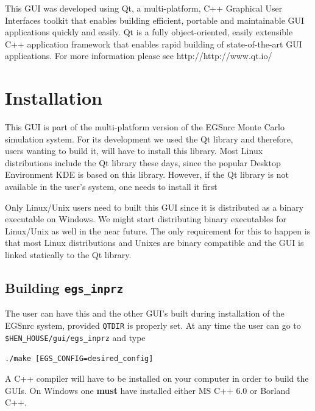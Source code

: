 \documentclass[12pt,twoside]{article}   %
\begin{document}
 This GUI was developed using Qt, a multi-platform, C++ Graphical User Interfaces toolkit
 that enables building efficient, portable and maintainable GUI applications
 quickly and easily. Qt is a fully object-oriented, easily extensible C++ application
 framework that enables rapid building of state-of-the-art GUI applications. For more
 information please see 
{http://http://www.qt.io/}


\newpage
\section{Installation}
\label{installation}


This GUI is part of the multi-platform version\cite{Ka03}
of the EGSnrc Monte Carlo simulation system\cite{Ka09a}.
For its development we used the Qt library and therefore,
users wanting to build it, will have to install this library. Most Linux distributions include the
Qt library these days, since the popular Desktop Environment KDE is based on this library. However,
if the Qt library is not available in the user's system, one needs to install it first

Only Linux/Unix users need to built this GUI since it is distributed as a binary executable on
Windows. We might start distributing binary executables for Linux/Unix as well in the near future.
The only requirement for this to happen is that most Linux distributions and Unixes are binary
compatible and the GUI is linked statically to the Qt library.




\subsection{Building {\tt egs\_inprz}}
\label{building}

The user can have this and the other GUI's built during installation of the EGSnrc system,
provided {\tt QTDIR} is properly set. At any time the user can go to
{\tt \$HEN\_HOUSE/gui/egs\_inprz} and type

      {\tt ./make [EGS\_CONFIG=desired\_config]}

\noindent A C++ compiler will have to be installed on
your computer in order to build the GUIs.
On Windows one {\bf must} have installed either MS C++ 6.0 or Borland C++.
\end{document}

